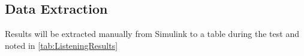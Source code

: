 \subsection{Data Extraction}
Results will be extracted manually from Simulink to a table during the test and noted in \autoref{tab:ListeningResults}

